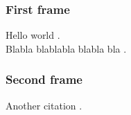 \documentclass{beamer}
\begin{document}
\begin{frame}
\frametitle{First frame}

Hello world .\\
Blabla blablabla blabla bla .

\end{frame}


\begin{frame}
\frametitle{Second frame}

Another citation .\\

\end{frame}
\end{document}
